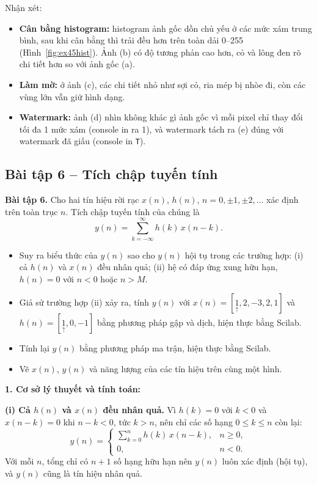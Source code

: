 \documentclass[12pt,a4paper]{article}
\newcommand{\org}[1]{\underset{\uparrow}{#1}}
\begin{document}
Nhận xét:
\begin{itemize}
    \item \textbf{Cân bằng histogram:} histogram ảnh gốc dồn chủ yếu ở các mức xám trung bình, sau khi cân bằng thì trải đều hơn trên toàn dải 0--255 (Hình~\ref{fig:ex45hist}). Ảnh (b) có độ tương phản cao hơn, cỏ và lông đen rõ chi tiết hơn so với ảnh gốc (a).
    \item \textbf{Làm mờ:} ở ảnh (c), các chi tiết nhỏ như sợi cỏ, ria mép bị nhòe đi, còn các vùng lớn vẫn giữ hình dạng.
    \item \textbf{Watermark:} ảnh (d) nhìn không khác gì ảnh gốc vì mỗi pixel chỉ thay đổi tối đa 1 mức xám (console in ra 1), và watermark tách ra (e) đúng với watermark đã giấu (console in \texttt{T}).
\end{itemize}

\subsection{Bài tập 6 -- Tích chập tuyến tính}
\begin{mdframed}[style=exbox]
\noindent\textbf{Bài tập 6.} Cho hai tín hiệu rời rạc $x(n)$, $h(n)$, $n = 0, \pm 1, \pm 2, \dots$ xác định trên toàn trục $n$. Tích chập tuyến tính của chúng là
\[
    y(n) = \sum_{k=-\infty}^{\infty} h(k)\, x(n-k).
\]
\begin{itemize}
    \item Suy ra biểu thức của $y(n)$ sao cho $y(n)$ hội tụ trong các trường hợp: (i) cả $h(n)$ và $x(n)$ đều nhân quả; (ii) hệ có đáp ứng xung hữu hạn, $h(n) = 0$ với $n < 0$ hoặc $n > M$.
    \item Giả sử trường hợp (ii) xảy ra, tính $y(n)$ với $x(n) = [\org{1}, 2, -3, 2, 1]$ và $h(n) = [\org{1}, 0, -1]$ bằng phương pháp gập và dịch, hiện thực bằng Scilab.
    \item Tính lại $y(n)$ bằng phương pháp ma trận, hiện thực bằng Scilab.
    \item Vẽ $x(n)$, $y(n)$ và năng lượng của các tín hiệu trên cùng một hình.
\end{itemize}
\end{mdframed}

\noindent\textbf{1. Cơ sở lý thuyết và tính toán:}

\textbf{(i) Cả $h(n)$ và $x(n)$ đều nhân quả.} Vì $h(k) = 0$ với $k < 0$ và $x(n-k) = 0$ khi $n - k < 0$, tức $k > n$, nên chỉ các số hạng $0 \le k \le n$ còn lại:
\begin{equation}
    y(n) =
    \begin{cases}
        \displaystyle\sum_{k=0}^{n} h(k)\, x(n-k), & n \ge 0, \\[2ex]
        0, & n < 0.
    \end{cases}
\end{equation}
Với mỗi $n$, tổng chỉ có $n + 1$ số hạng hữu hạn nên $y(n)$ luôn xác định (hội tụ), và $y(n)$ cũng là tín hiệu nhân quả.
\end{document}
